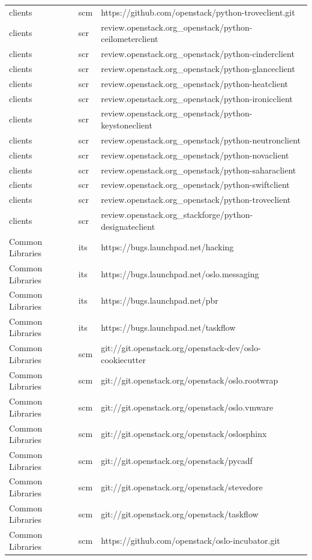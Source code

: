 \documentclass[a4wide,11pt]{report}
\begin{document}
\begin{center}
\begin{longtable}{|p{4cm}|p{1cm}|p{10cm}|}
clients&scm&https://github.com/openstack/python-troveclient.git\\ 
clients&scr&review.openstack.org\_openstack/python-ceilometerclient\\ 
clients&scr&review.openstack.org\_openstack/python-cinderclient\\ 
clients&scr&review.openstack.org\_openstack/python-glanceclient\\ 
clients&scr&review.openstack.org\_openstack/python-heatclient\\ 
clients&scr&review.openstack.org\_openstack/python-ironicclient\\ 
clients&scr&review.openstack.org\_openstack/python-keystoneclient\\ 
clients&scr&review.openstack.org\_openstack/python-neutronclient\\ 
clients&scr&review.openstack.org\_openstack/python-novaclient\\ 
clients&scr&review.openstack.org\_openstack/python-saharaclient\\ 
clients&scr&review.openstack.org\_openstack/python-swiftclient\\ 
clients&scr&review.openstack.org\_openstack/python-troveclient\\ 
clients&scr&review.openstack.org\_stackforge/python-designateclient\\ 
Common Libraries&its&https://bugs.launchpad.net/hacking\\ 
Common Libraries&its&https://bugs.launchpad.net/oslo.messaging\\ 
Common Libraries&its&https://bugs.launchpad.net/pbr\\ 
Common Libraries&its&https://bugs.launchpad.net/taskflow\\ 
Common Libraries&scm&git://git.openstack.org/openstack-dev/oslo-cookiecutter\\ 
Common Libraries&scm&git://git.openstack.org/openstack/oslo.rootwrap\\ 
Common Libraries&scm&git://git.openstack.org/openstack/oslo.vmware\\ 
Common Libraries&scm&git://git.openstack.org/openstack/oslosphinx\\ 
Common Libraries&scm&git://git.openstack.org/openstack/pycadf\\ 
Common Libraries&scm&git://git.openstack.org/openstack/stevedore\\ 
Common Libraries&scm&git://git.openstack.org/openstack/taskflow\\ 
Common Libraries&scm&https://github.com/openstack/oslo-incubator.git\\ 

\end{longtable}
\end{center}
\end{document}
